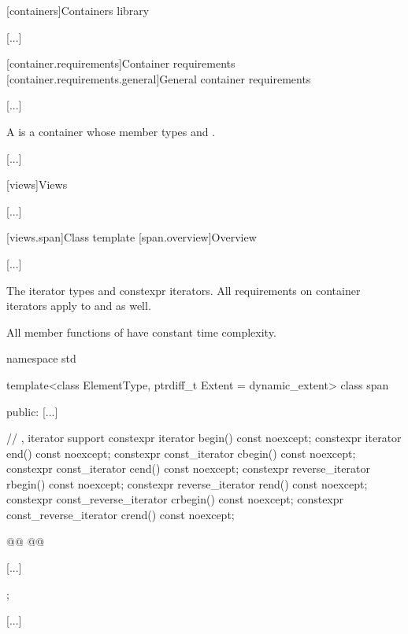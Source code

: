 
[containers]{Containers library}

[...]

\setcounter{section}{1}
[container.requirements]{Container requirements}
[container.requirements.general]{General container requirements}

[...]

\setcounter{Paras}{12}
\pnum
{}%
A 
is a container  whose member types  and 
.

[...]

\setcounter{section}{6}
[views]{Views}

[...]

\setcounter{subsection}{2}
[views.span]{Class template }
[span.overview]{Overview}

[...]

\setcounter{Paras}{1}
\pnum
The iterator types  and 
 
constexpr iterators.
All requirements on container iterators apply to
 and  as well.

\pnum
All member functions of  have constant time complexity.

%
\begin{codeblock}
namespace std {
  template<class ElementType, ptrdiff_t Extent = dynamic_extent>
  class span {
  public:
    [...]

    // , iterator support
    constexpr iterator begin() const noexcept;
    constexpr iterator end() const noexcept;
    constexpr const_iterator cbegin() const noexcept;
    constexpr const_iterator cend() const noexcept;
    constexpr reverse_iterator rbegin() const noexcept;
    constexpr reverse_iterator rend() const noexcept;
    constexpr const_reverse_iterator crbegin() const noexcept;
    constexpr const_reverse_iterator crend() const noexcept;

    @@
    @@

    [...]
  };
}
\end{codeblock}

[...]
